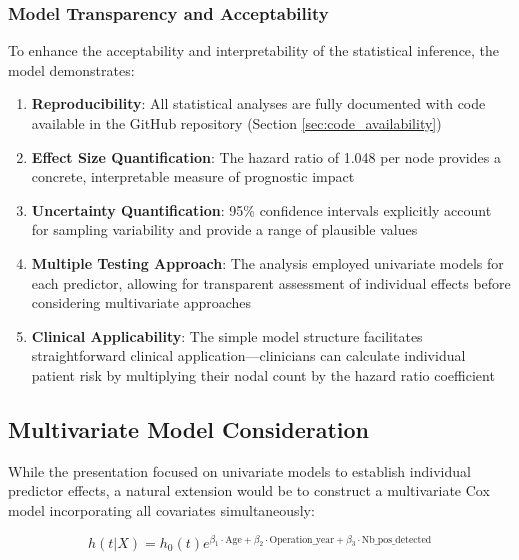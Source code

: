 \documentclass[12pt,a4paper]{article}
\begin{document}
\subsubsection{Model Transparency and Acceptability}

To enhance the acceptability and interpretability of the statistical inference, the model demonstrates:

\begin{enumerate}
    \item \textbf{Reproducibility}: All statistical analyses are fully documented with code available in the GitHub repository (Section \ref{sec:code_availability})
    
    \item \textbf{Effect Size Quantification}: The hazard ratio of 1.048 per node provides a concrete, interpretable measure of prognostic impact
    
    \item \textbf{Uncertainty Quantification}: 95\% confidence intervals explicitly account for sampling variability and provide a range of plausible values
    
    \item \textbf{Multiple Testing Approach}: The analysis employed univariate models for each predictor, allowing for transparent assessment of individual effects before considering multivariate approaches
    
    \item \textbf{Clinical Applicability}: The simple model structure facilitates straightforward clinical application—clinicians can calculate individual patient risk by multiplying their nodal count by the hazard ratio coefficient
\end{enumerate}

\subsection{Multivariate Model Consideration}

While the presentation focused on univariate models to establish individual predictor effects, a natural extension would be to construct a multivariate Cox model incorporating all covariates simultaneously:

\begin{equation}
h(t|X) = h_0(t) e^{\beta_1 \cdot \text{Age} + \beta_2 \cdot \text{Operation\_year} + \beta_3 \cdot \text{Nb\_pos\_detected}}
\label{eq:multivariate_model}
\end{equation}
\end{document}
